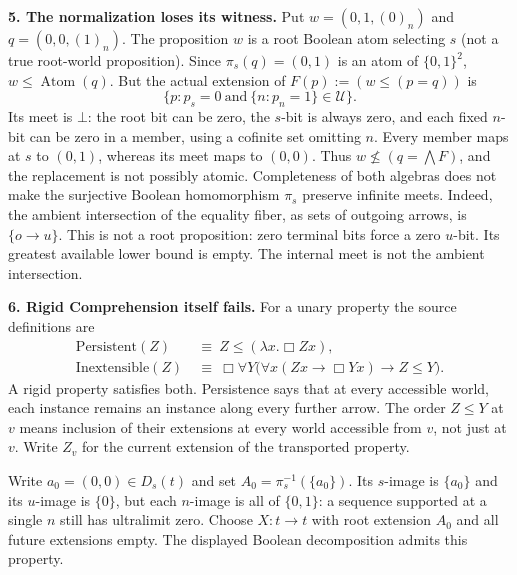 \documentclass[12pt,leqno]{article}
\newcommand{\IC}{\ensuremath{\rightarrow}}
\newcommand{\U}{\mathcal U}
\newcommand{\two}{\{0,1\}}
\newcommand{\Atom}{\operatorname{Atom}}
\begin{document}
\medskip
\noindent\textbf{5. The normalization loses its witness.}
Put $w=(0,1,(0)_n)$ and $q=(0,0,(1)_n)$.
The proposition $w$ is a root Boolean atom selecting $s$ (not a true
root-world proposition). Since $\pi_s(q)=(0,1)$ is an atom of $\two^2$,
$w\leq\Atom(q)$. But the actual extension of
$F(p):=(w\leq(p=q))$ is
\[
 \{p:p_s=0\ \text{and}\ \{n:p_n=1\}\in\U\}.
\]
Its meet is $\bot$: the root bit can be zero, the $s$-bit is always zero,
and each fixed $n$-bit can be zero in a member, using a cofinite set
omitting $n$. Every member maps at $s$ to $(0,1)$, whereas its meet maps
to $(0,0)$. Thus $w\not\leq(q=\bigwedge F)$, and the replacement is not
possibly atomic. Completeness of both algebras does not make the
surjective Boolean homomorphism $\pi_s$ preserve infinite meets.
Indeed, the ambient intersection of the equality fiber, as sets of
outgoing arrows, is $\{o\to u\}$. This is not a root proposition:
zero terminal bits force a zero $u$-bit. Its greatest available lower
bound is empty. The internal meet is not the ambient intersection.

\medskip
\noindent\textbf{6. Rigid Comprehension itself fails.}
For a unary property the source definitions are
\begin{align*}
 \mathrm{Persistent}(Z)&\ \equiv\ Z\leq(\lambda x.\Box Zx),\\
 \mathrm{Inextensible}(Z)&\ \equiv\
 \Box\forall Y\bigl(\forall x(Zx\IC\Box Yx)\IC Z\leq Y\bigr).
\end{align*}
A rigid property satisfies both. Persistence says that at every
accessible world, each instance remains an instance along every
further arrow. The order $Z\leq Y$ at $v$ means inclusion of their
extensions at every world accessible from $v$, not just at $v$.
Write $Z_v$ for the current extension of the transported property.

Write $a_0=(0,0)\in D_s(t)$ and set
$A_0=\pi_s^{-1}(\{a_0\})$.
Its $s$-image is $\{a_0\}$ and its $u$-image is $\{0\}$, but each
$n$-image is all of $\two$: a sequence supported at a single $n$ still
has ultralimit zero. Choose $X:t\to t$ with root extension $A_0$ and
all future extensions empty. The displayed Boolean decomposition
admits this property.
\end{document}
